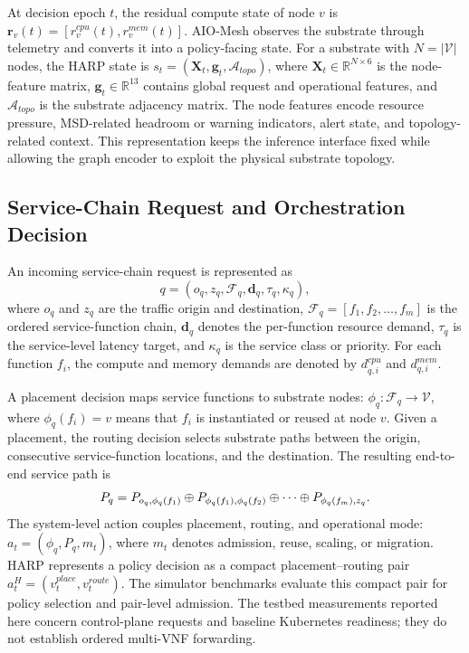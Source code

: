 \documentclass[final,5p]{elsarticle}
\newcommand{\rev}[1]{\textcolor{revisiongreen}{#1}}
\let\newrev\rev
\begin{document}
At decision epoch \(t\), the residual compute state of node \(v\) is $\mathbf{r}_v(t)=\left[r_v^{cpu}(t),r_v^{mem}(t)\right]$. AIO-Mesh observes the substrate through telemetry and converts it into a policy-facing state. For a substrate with \(N=|\mathcal{V}|\) nodes, the HARP state is $s_t=(\mathbf{X}_t,\mathbf{g}_t,\mathcal{A}_{topo})$, where \(\mathbf{X}_t\in\mathbb{R}^{N\times 6}\) is the node-feature matrix, \(\mathbf{g}_t\in\mathbb{R}^{13}\) contains global request and operational features, and \(\mathcal{A}_{topo}\) is the substrate adjacency matrix. The node features encode resource pressure, MSD-related headroom or warning indicators, alert state, and topology-related context. This representation keeps the inference interface fixed while allowing the graph encoder to exploit the physical substrate topology.

\subsection{Service-Chain Request and Orchestration Decision}
\label{subsec:sfc_model}

An incoming service-chain request is represented as
\begin{equation}
q=(o_q,z_q,\mathcal{F}_q,\mathbf{d}_q,\tau_q,\kappa_q),
\end{equation}
where \(o_q\) and \(z_q\) are the traffic origin and destination, \(\mathcal{F}_q=[f_1,f_2,\ldots,f_m]\) is the ordered service-function chain, \(\mathbf{d}_q\) denotes the per-function resource demand, \(\tau_q\) is the service-level latency target, and \(\kappa_q\) is the service class or priority. For each function \(f_i\), the compute and memory demands are denoted by \(d_{q,i}^{cpu}\) and \(d_{q,i}^{mem}\).

A placement decision maps service functions to substrate nodes: $\phi_q:\mathcal{F}_q\rightarrow\mathcal{V}$, where \(\phi_q(f_i)=v\) means that \(f_i\) is instantiated or reused at node \(v\). Given a placement, the routing decision selects substrate paths between the origin, consecutive service-function locations, and the destination. The resulting end-to-end service path is
\begin{equation}
\rev{P_q=P_{o_q,\phi_q(f_1)}\oplus P_{\phi_q(f_1),\phi_q(f_2)}\oplus\cdots\oplus P_{\phi_q(f_m),z_q}.}
\label{eq:full_chain_path}
\end{equation}
\newrev{The system-level action couples placement, routing, and operational mode: $a_t=(\phi_q,P_q,m_t)$, where \(m_t\) denotes admission, reuse, scaling, or migration. HARP represents a policy decision as a compact placement--routing pair \(a_t^H=(v_t^{place},v_t^{route})\). The simulator benchmarks evaluate this compact pair for policy selection and pair-level admission. The testbed measurements reported here concern control-plane requests and baseline Kubernetes readiness; they do not establish ordered multi-VNF forwarding.}
\end{document}
